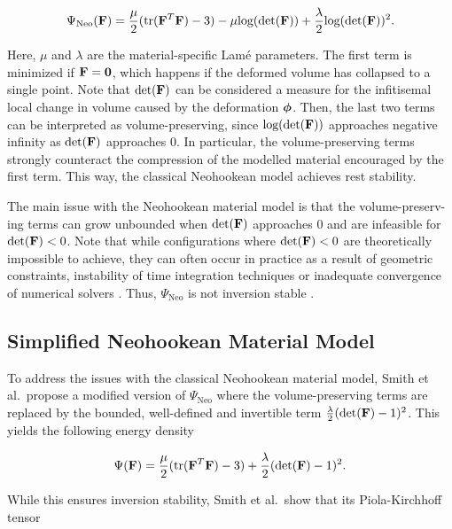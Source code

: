 \begin{equation}\label{eq:neohookean-material-model}
    \Psi_{\text{Neo}}(\mathbf{F}) = \frac{\mu}{2}(\text{tr}(\mathbf{F}^T\mathbf{F}) - 3) - \mu \text{log}(\text{det}(\mathbf{F})) 
    + \frac{\lambda}{2}\text{log}(\text{det}(\mathbf{F}))^2.
\end{equation}

\noindent Here, $\mu$ and $\lambda$ are the material-specific Lamé parameters. The first term is minimized if $\mathbf{F} = \mathbf{0}$, which 
happens if the deformed volume has collapsed to a single point. Note that $\text{det}(\mathbf{F})$ can be considered a measure for the 
infitisemal local change in volume caused by the deformation $\bm{\phi}$. Then, the last two terms can be interpreted as volume-preserving, 
since $\text{log}(\text{det}(\mathbf{F}))$ approaches negative infinity as $\text{det}(\mathbf{F})$ approaches $0$. In particular, 
the volume-preserving terms strongly counteract the compression of the modelled material encouraged by the first term. This way, the 
classical Neohookean model achieves rest stability.

The main issue with the Neohookean material model is that the volume-preserv-ing terms can grow unbounded when $\text{det}(\mathbf{F})$ approaches 
$0$ and are infeasible for $\text{det}(\mathbf{F}) < 0$. Note that while configurations where $\text{det}(\mathbf{F}) < 0$ are theoretically 
impossible to achieve, they can often occur in practice as a result of geometric constraints, instability of time integration techniques or 
inadequate convergence of numerical solvers \cite{sifakis2012}. Thus, $\Psi_{\text{Neo}}$ is not inversion stable \cite{smith2018}.

\subsection{Simplified Neohookean Material Model}\label{ss:simplified-neohookean-material}
To address the issues with the classical Neohookean material model, Smith et al.\ propose a modified version of $\Psi_{\text{Neo}}$ where 
the volume-preserving terms are replaced by the bounded, well-defined and invertible term $\frac{\lambda}{2}(\text{det}(\mathbf{F}) - 1)^2$. 
This yields the following energy density

\[
    \Psi(\mathbf{F}) = \frac{\mu}{2}(\text{tr}(\mathbf{F}^T\mathbf{F}) - 3) + \frac{\lambda}{2}(\text{det}(\mathbf{F})-1)^2.
\]

\noindent While this ensures inversion stability, Smith et al.\ show that its Piola-Kirchhoff tensor 

